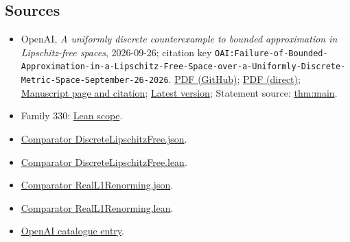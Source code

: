 \documentclass[11pt]{article}
\begin{document}
\subsection{Sources}
\begin{itemize}
\item OpenAI, \emph{A uniformly discrete counterexample to bounded approximation in Lipschitz-free spaces}, 2026-09-26; citation key \texttt{OAI:Failure-of-Bounded-Approximation-in-a-Lipschitz-Free-Space-over-a-Uniformly-Discrete-Metric-Space-September-26-2026}. \href{https://github.com/openai/math/blob/adc7f1241b42e322a6451854ab7e4b4c146bf78a/preprints/Failure-of-Bounded-Approximation-in-a-Lipschitz-Free-Space-over-a-Uniformly-Discrete-Metric-Space-September-26-2026/main.pdf}{PDF (GitHub)}; \href{https://github.com/openai/math/raw/adc7f1241b42e322a6451854ab7e4b4c146bf78a/preprints/Failure-of-Bounded-Approximation-in-a-Lipschitz-Free-Space-over-a-Uniformly-Discrete-Metric-Space-September-26-2026/main.pdf}{PDF (direct)}; \href{https://github.com/openai/math/blob/adc7f1241b42e322a6451854ab7e4b4c146bf78a/preprints/Failure-of-Bounded-Approximation-in-a-Lipschitz-Free-Space-over-a-Uniformly-Discrete-Metric-Space-September-26-2026/README.md}{Manuscript page and citation}; \href{https://github.com/openai/math/blob/main/preprints/Failure-of-Bounded-Approximation-in-a-Lipschitz-Free-Space-over-a-Uniformly-Discrete-Metric-Space-September-26-2026/main.pdf}{Latest version}; Statement source: \href{https://github.com/openai/math/blob/adc7f1241b42e322a6451854ab7e4b4c146bf78a/preprints/Failure-of-Bounded-Approximation-in-a-Lipschitz-Free-Space-over-a-Uniformly-Discrete-Metric-Space-September-26-2026/build/sections/introduction.tex\#L39}{thm:main}.
\item Family 330: \href{https://github.com/openai/math/blob/adc7f1241b42e322a6451854ab7e4b4c146bf78a/lean/docs/330.md}{Lean scope}.
\item \href{https://github.com/openai/math/blob/adc7f1241b42e322a6451854ab7e4b4c146bf78a/lean/ComparatorChallenges/DiscreteLipschitzFree.json}{Comparator DiscreteLipschitzFree.json}.
\item \href{https://github.com/openai/math/blob/adc7f1241b42e322a6451854ab7e4b4c146bf78a/lean/ComparatorChallenges/DiscreteLipschitzFree.lean}{Comparator DiscreteLipschitzFree.lean}.
\item \href{https://github.com/openai/math/blob/adc7f1241b42e322a6451854ab7e4b4c146bf78a/lean/ComparatorChallenges/RealL1Renorming.json}{Comparator RealL1Renorming.json}.
\item \href{https://github.com/openai/math/blob/adc7f1241b42e322a6451854ab7e4b4c146bf78a/lean/ComparatorChallenges/RealL1Renorming.lean}{Comparator RealL1Renorming.lean}.
\item \href{https://github.com/openai/math/blob/adc7f1241b42e322a6451854ab7e4b4c146bf78a/CONTENTS.md}{OpenAI catalogue entry}.
\end{itemize}
\end{document}
